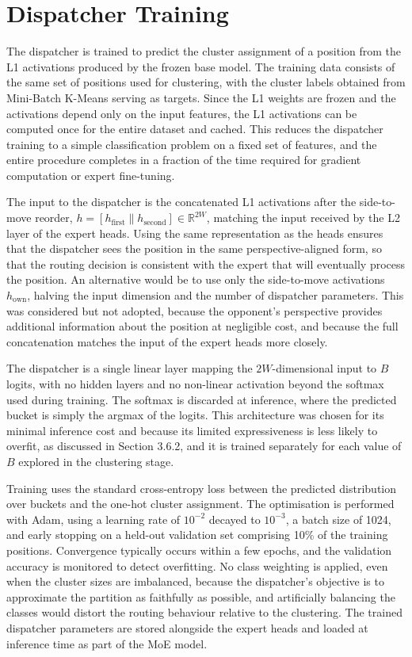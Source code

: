\section{Dispatcher Training}

The dispatcher is trained to predict the cluster assignment of a position from the L1 activations produced by the frozen base model. The training data consists of the same set of positions used for clustering, with the cluster labels obtained from Mini-Batch K-Means serving as targets. Since the L1 weights are frozen and the activations depend only on the input features, the L1 activations can be computed once for the entire dataset and cached. This reduces the dispatcher training to a simple classification problem on a fixed set of features, and the entire procedure completes in a fraction of the time required for gradient computation or expert fine-tuning.

The input to the dispatcher is the concatenated L1 activations after the side-to-move reorder, $h = [h_{\text{first}} \| h_{\text{second}}] \in \mathbb{R}^{2W}$, matching the input received by the L2 layer of the expert heads. Using the same representation as the heads ensures that the dispatcher sees the position in the same perspective-aligned form, so that the routing decision is consistent with the expert that will eventually process the position. An alternative would be to use only the side-to-move activations $h_{\text{own}}$, halving the input dimension and the number of dispatcher parameters. This was considered but not adopted, because the opponent's perspective provides additional information about the position at negligible cost, and because the full concatenation matches the input of the expert heads more closely.

The dispatcher is a single linear layer mapping the $2W$-dimensional input to $B$ logits, with no hidden layers and no non-linear activation beyond the softmax used during training. The softmax is discarded at inference, where the predicted bucket is simply the argmax of the logits. This architecture was chosen for its minimal inference cost and because its limited expressiveness is less likely to overfit, as discussed in Section 3.6.2, and it is trained separately for each value of $B$ explored in the clustering stage.

Training uses the standard cross-entropy loss between the predicted distribution over buckets and the one-hot cluster assignment. The optimisation is performed with Adam, using a learning rate of $10^{-2}$ decayed to $10^{-3}$, a batch size of 1024, and early stopping on a held-out validation set comprising 10\% of the training positions. Convergence typically occurs within a few epochs, and the validation accuracy is monitored to detect overfitting. No class weighting is applied, even when the cluster sizes are imbalanced, because the dispatcher's objective is to approximate the partition as faithfully as possible, and artificially balancing the classes would distort the routing behaviour relative to the clustering. The trained dispatcher parameters are stored alongside the expert heads and loaded at inference time as part of the MoE model.

